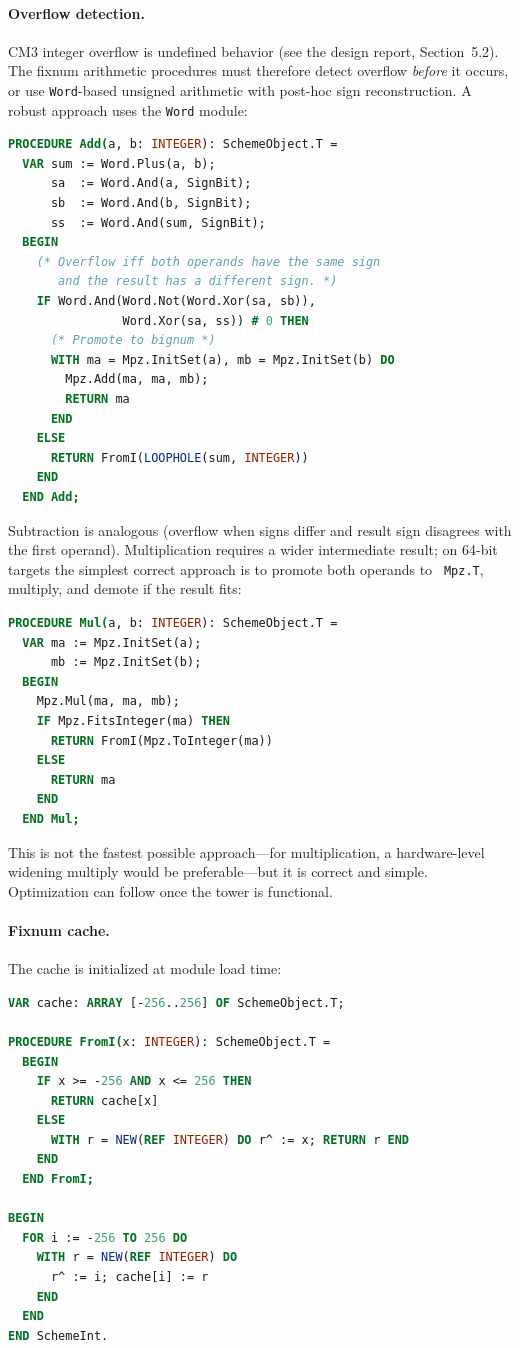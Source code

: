 \documentclass[12pt]{article}
\begin{document}
\paragraph{Overflow detection.}
CM3 integer overflow is undefined behavior (see the design report,
Section~5.2).  The fixnum arithmetic procedures must therefore
detect overflow \emph{before} it occurs, or use {\tt Word}-based
unsigned arithmetic with post-hoc sign reconstruction.  A robust
approach uses the {\tt Word} module:

\begin{lstlisting}[language=Modula3]
PROCEDURE Add(a, b: INTEGER): SchemeObject.T =
  VAR sum := Word.Plus(a, b);
      sa  := Word.And(a, SignBit);
      sb  := Word.And(b, SignBit);
      ss  := Word.And(sum, SignBit);
  BEGIN
    (* Overflow iff both operands have the same sign
       and the result has a different sign. *)
    IF Word.And(Word.Not(Word.Xor(sa, sb)),
                Word.Xor(sa, ss)) # 0 THEN
      (* Promote to bignum *)
      WITH ma = Mpz.InitSet(a), mb = Mpz.InitSet(b) DO
        Mpz.Add(ma, ma, mb);
        RETURN ma
      END
    ELSE
      RETURN FromI(LOOPHOLE(sum, INTEGER))
    END
  END Add;
\end{lstlisting}

\noindent Subtraction is analogous (overflow when signs differ and
result sign disagrees with the first operand).  Multiplication
requires a wider intermediate result; on 64-bit targets the
simplest correct approach is to promote both operands to {\tt
Mpz.T}, multiply, and demote if the result fits:

\begin{lstlisting}[language=Modula3]
PROCEDURE Mul(a, b: INTEGER): SchemeObject.T =
  VAR ma := Mpz.InitSet(a);
      mb := Mpz.InitSet(b);
  BEGIN
    Mpz.Mul(ma, ma, mb);
    IF Mpz.FitsInteger(ma) THEN
      RETURN FromI(Mpz.ToInteger(ma))
    ELSE
      RETURN ma
    END
  END Mul;
\end{lstlisting}

\noindent This is not the fastest possible approach---for
multiplication, a hardware-level widening multiply would be
preferable---but it is correct and simple.  Optimization can follow
once the tower is functional.

\paragraph{Fixnum cache.}
The cache is initialized at module load time:

\begin{lstlisting}[language=Modula3]
VAR cache: ARRAY [-256..256] OF SchemeObject.T;

PROCEDURE FromI(x: INTEGER): SchemeObject.T =
  BEGIN
    IF x >= -256 AND x <= 256 THEN
      RETURN cache[x]
    ELSE
      WITH r = NEW(REF INTEGER) DO r^ := x; RETURN r END
    END
  END FromI;

BEGIN
  FOR i := -256 TO 256 DO
    WITH r = NEW(REF INTEGER) DO
      r^ := i; cache[i] := r
    END
  END
END SchemeInt.
\end{lstlisting}
\end{document}
